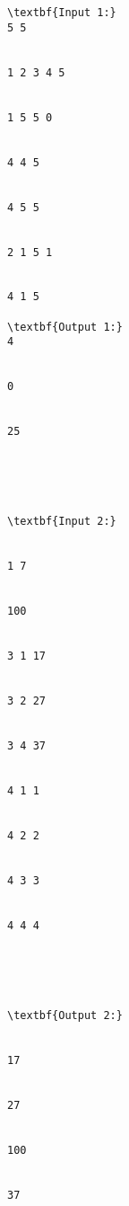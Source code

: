 \begin{verbatim}
\textbf{Input 1:}
5 5 


1 2 3 4 5 


1 5 5 0 


4 4 5 


4 5 5 


2 1 5 1 


4 1 5

\textbf{Output 1:}
4


0


25 





\textbf{Input 2:}


1 7 


100 


3 1 17 


3 2 27 


3 4 37 


4 1 1 


4 2 2 


4 3 3 


4 4 4





\textbf{Output 2:}


17 


27 


100


37


\end{verbatim}